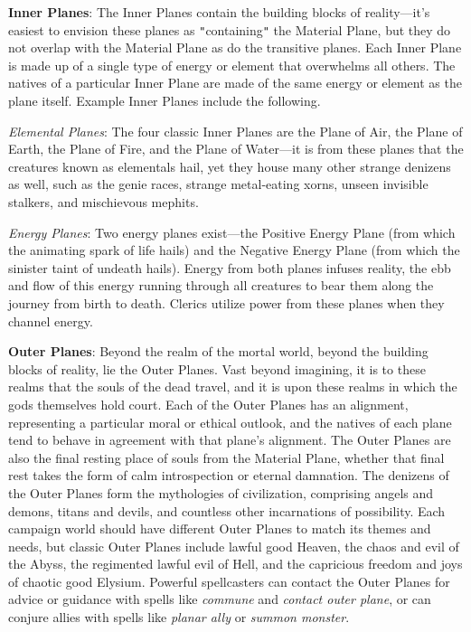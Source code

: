 \textbf{Inner Planes}: The Inner Planes contain the building blocks of reality---it's easiest to envision these planes as \texttt{{}"{}}containing\texttt{{}"{}} the Material Plane, but they do not overlap with the Material Plane as do the transitive planes. Each Inner Plane is made up of a single type of energy or element that overwhelms all others. The natives of a particular Inner Plane are made of the same energy or element as the plane itself. Example Inner Planes include the following.
				
\textit{Elemental Planes}: The four classic Inner Planes are the Plane of Air, the Plane of Earth, the Plane of Fire, and the Plane of Water---it is from these planes that the creatures known as elementals hail, yet they house many other strange denizens as well, such as the genie races, strange metal-eating xorns, unseen invisible stalkers, and mischievous mephits.
				
\textit{Energy Planes}: Two energy planes exist---the Positive Energy Plane (from which the animating spark of life hails) and the Negative Energy Plane (from which the sinister taint of undeath hails). Energy from both planes infuses reality, the ebb and flow of this energy running through all creatures to bear them along the journey from birth to death. Clerics utilize power from these planes when they channel energy.
				
\textbf{Outer Planes}: Beyond the realm of the mortal world, beyond the building blocks of reality, lie the Outer Planes. Vast beyond imagining, it is to these realms that the souls of the dead travel, and it is upon these realms in which the gods themselves hold court. Each of the Outer Planes has an alignment, representing a particular moral or ethical outlook, and the natives of each plane tend to behave in agreement with that plane's alignment. The Outer Planes are also the final resting place of souls from the Material Plane, whether that final rest takes the form of calm introspection or eternal damnation. The denizens of the Outer Planes form the mythologies of civilization, comprising angels and demons, titans and devils, and countless other incarnations of possibility. Each campaign world should have different Outer Planes to match its themes and needs, but classic Outer Planes include lawful good Heaven, the chaos and evil of the Abyss, the regimented lawful evil of Hell, and the capricious freedom and joys of chaotic good Elysium. Powerful spellcasters can contact the Outer Planes for advice or guidance with spells like \textit{commune} and \textit{contact outer plane}, or can conjure allies with spells like \textit{planar ally} or \textit{summon monster}.
				
